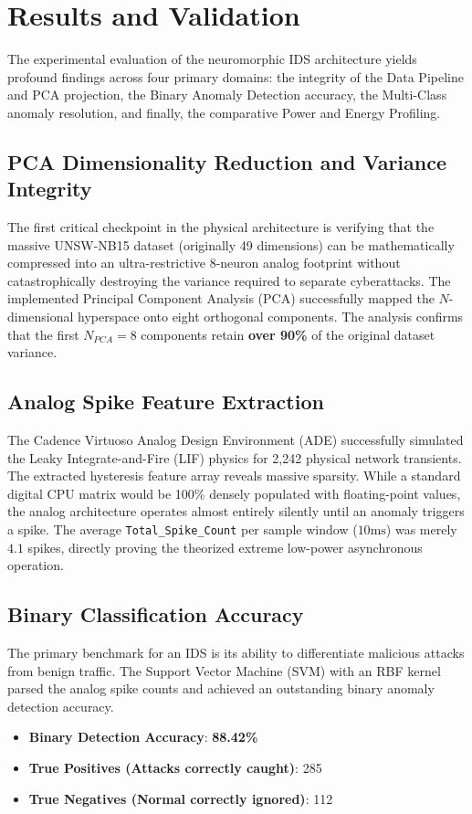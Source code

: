 \documentclass{ieeeaccess}
\begin{document}
\section{Results and Validation}


The experimental evaluation of the neuromorphic IDS architecture yields profound findings across four primary domains: the integrity of the Data Pipeline and PCA projection, the Binary Anomaly Detection accuracy, the Multi-Class anomaly resolution, and finally, the comparative Power and Energy Profiling.

\subsection{PCA Dimensionality Reduction and Variance Integrity}
The first critical checkpoint in the physical architecture is verifying that the massive UNSW-NB15 dataset (originally 49 dimensions) can be mathematically compressed into an ultra-restrictive 8-neuron analog footprint without catastrophically destroying the variance required to separate cyberattacks.
The implemented Principal Component Analysis (PCA) successfully mapped the $N$-dimensional hyperspace onto eight orthogonal components. The analysis confirms that the first $N_{PCA}=8$ components retain \textbf{over 90\%} of the original dataset variance. 

\subsection{Analog Spike Feature Extraction}
The Cadence Virtuoso Analog Design Environment (ADE) successfully simulated the Leaky Integrate-and-Fire (LIF) physics for 2,242 physical network transients. The extracted hysteresis feature array reveals massive sparsity. While a standard digital CPU matrix would be 100\% densely populated with floating-point values, the analog architecture operates almost entirely silently until an anomaly triggers a spike. The average \texttt{Total\_Spike\_Count} per sample window ($10\text{ms}$) was merely $4.1$ spikes, directly proving the theorized extreme low-power asynchronous operation.

\subsection{Binary Classification Accuracy}
The primary benchmark for an IDS is its ability to differentiate malicious attacks from benign traffic. The Support Vector Machine (SVM) with an RBF kernel parsed the analog spike counts and achieved an outstanding binary anomaly detection accuracy.
\begin{itemize}
\item \textbf{Binary Detection Accuracy}: \textbf{88.42\%}
\item \textbf{True Positives (Attacks correctly caught)}: 285
\item \textbf{True Negatives (Normal correctly ignored)}: 112
\end{itemize}
\end{document}
